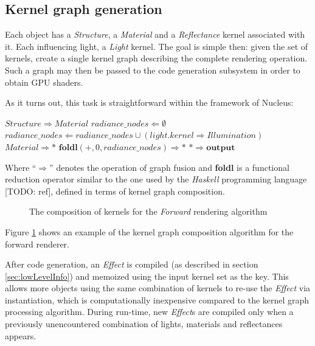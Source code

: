 \subsection{Kernel graph generation}

Each object has a \emph{Structure}, a \emph{Material} and a \emph{Reflectance} kernel associated with it. Each influencing light, a \emph{Light} kernel. The goal is simple then: given the set of kernels, create a single kernel graph describing the complete rendering operation. Such a graph may then be passed to the code generation subsystem in order to obtain GPU shaders.

As it turns out, this task is straightforward within the framework of Nucleus:
	
\begin{algorithmic}
\STATE $Structure \Rightarrow Material$
\STATE $radiance\_nodes \Leftarrow \emptyset$
	\STATE $radiance\_nodes \Leftarrow radiance\_nodes \cup (light.kernel \Rightarrow Illumination)$
\ENDFOR
\STATE $Material \Rightarrow *$
\STATE $\textbf{foldl}(+, 0,radiance\_nodes) \Rightarrow *$
\STATE $* \Rightarrow \textbf{output}$
\end{algorithmic}

Where ``$\Rightarrow$'' denotes the operation of graph fusion and \textbf{foldl} is a functional reduction operator similar to the one used by the \emph{Haskell} programming language [TODO: ref], defined in terms of kernel graph composition.

\begin{figure}[h!]
  \centering
    \caption[Forward rendering graph]{The composition of kernels for the \emph{Forward} rendering algorithm}
  \label{fig:ForwardRenderingGraphSample}
\end{figure}

Figure \ref{fig:ForwardRenderingGraphSample} shows an example of the kernel graph composition algorithm for the forward renderer.

After code generation, an \emph{Effect} is compiled (as described in section \ref{sec:lowLevelInfo}) and memoized using the input kernel set as the key. This allows more objects using the same combination of kernels to re-use the \emph{Effect} via instantiation, which is computationally inexpensive compared to the kernel graph processing algorithm. During run-time, new \emph{Effect}s are compiled only when a previously unencountered combination of lights, materials and reflectances appears.

